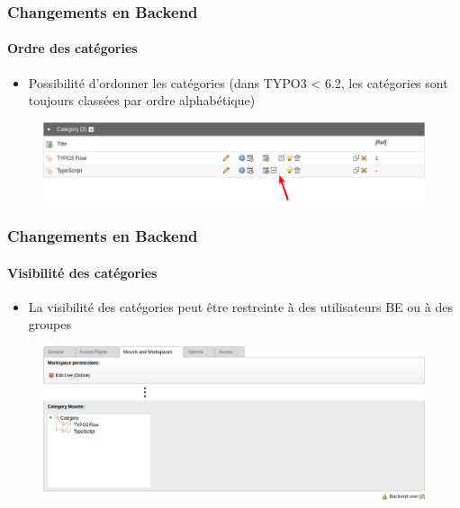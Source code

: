 
\begin{frame}[fragile]
	\frametitle{Changements en Backend}
	\framesubtitle{Ordre des catégories}

 	\begin{itemize}
		\item Possibilité d'ordonner les catégories\newline
			(dans TYPO3 < 6.2, les catégories sont toujours classées par ordre alphabétique)
	\end{itemize}

	\begin{figure}
		\includegraphics[width=0.95\linewidth]{Images/BackendChanges/CategorySorting.png}
	\end{figure}

\end{frame}


\begin{frame}[fragile]
	\frametitle{Changements en Backend}
	\framesubtitle{Visibilité des catégories}

 	\begin{itemize}
		\item La visibilité des catégories peut être restreinte à des utilisateurs BE ou à des groupes
	\end{itemize}

	\begin{figure}
		\includegraphics[width=0.95\linewidth]{Images/BackendChanges/CategoryVisibility.png}
	\end{figure}

\end{frame}

